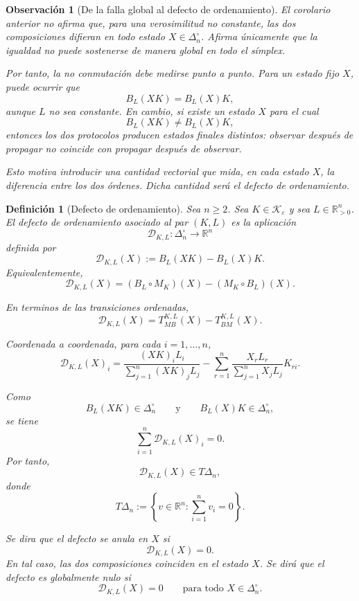 ﻿\documentclass[12pt]{article}
\newtheorem{definicion}{Definición}[section]
\newtheorem{observacion}{Observación}[section]
\begin{document}
\begin{observacion}[De la falla global al defecto de ordenamiento]
El corolario anterior no afirma que, para una verosimilitud no constante, las dos composiciones difieran en todo estado \(X\in\Delta_n^\circ\). Afirma únicamente que la igualdad no puede sostenerse de manera global en todo el símplex.

Por tanto, la no conmutación debe medirse punto a punto. Para un estado fijo \(X\), puede ocurrir que
\[
B_L(XK)=B_L(X)K,
\]
aunque \(L\) no sea constante. En cambio, si existe un estado \(X\) para el cual
\[
B_L(XK)\neq B_L(X)K,
\]
entonces los dos protocolos producen estados finales distintos: observar después de propagar no coincide con propagar después de observar.

Esto motiva introducir una cantidad vectorial que mida, en cada estado \(X\), la diferencia entre los dos órdenes. Dicha cantidad será el defecto de ordenamiento.
\end{observacion}

\begin{definicion}[Defecto de ordenamiento]
\label{def:defecto_ordenamiento}
Sea \(n\ge 2\). Sea \(K\in\mathcal K_\varepsilon\) y sea \(L\in\mathbb R_{>0}^n\). El defecto de ordenamiento asociado al par \((K,L)\) es la aplicación
\[
\mathcal D_{K,L}:\Delta_n^\circ\longrightarrow \mathbb R^n
\]
definida por
\[
\mathcal D_{K,L}(X)
:=
B_L(XK)-B_L(X)K.
\]
Equivalentemente,
\[
\mathcal D_{K,L}(X)
=
(B_L\circ M_K)(X)
-
(M_K\circ B_L)(X).
\]

En terminos de las transiciones ordenadas,
\[
\mathcal D_{K,L}(X)
=
T_{MB}^{K,L}(X)-T_{BM}^{K,L}(X).
\]

Coordenada a coordenada, para cada \(i=1,\dots,n\),
\[
\mathcal D_{K,L}(X)_i
=
\frac{(XK)_iL_i}{\sum_{j=1}^n (XK)_jL_j}
-
\sum_{r=1}^n
\frac{X_rL_r}{\sum_{j=1}^n X_jL_j}K_{ri}.
\]

Como
\[
B_L(XK)\in\Delta_n^\circ
\qquad
\text{y}
\qquad
B_L(X)K\in\Delta_n^\circ,
\]
se tiene
\[
\sum_{i=1}^n \mathcal D_{K,L}(X)_i=0.
\]
Por tanto,
\[
\mathcal D_{K,L}(X)\in T\Delta_n,
\]
donde
\[
T\Delta_n
:=
\left\{
v\in\mathbb R^n:
\sum_{i=1}^n v_i=0
\right\}.
\]

Se dira que el defecto se anula en \(X\) si
\[
\mathcal D_{K,L}(X)=0.
\]
En tal caso, las dos composiciones coinciden en el estado \(X\). Se dirá que el defecto es globalmente nulo si
\[
\mathcal D_{K,L}(X)=0
\qquad
\text{para todo }X\in\Delta_n^\circ.
\]
\end{definicion}
\end{document}
